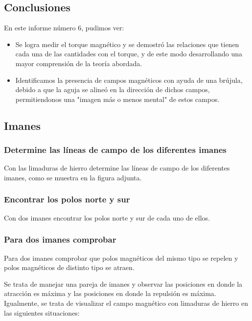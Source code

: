\subsection{Conclusiones}

En este informe número 6, pudimos ver:

\begin{itemize}
    \item Se logra medir el torque magnético y se demostró las relaciones que
          tienen cada una de las cantidades con el torque, y de este modo
          desarrollando una mayor comprensión de la teoría abordada.
    \item Identificamos la presencia de campos magnéticos con ayuda de una
          brújula, debido a que la aguja se alineó en la dirección de dichos
          campos, permitiendonos una "imagen más o menos mental" de estos campos.
\end{itemize}



\subsection{Imanes}

\subsubsection{Determine las líneas de campo de los diferentes imanes}
Con las limaduras de hierro determine las líneas de campo de los diferentes
imanes, como se muestra en la figura adjunta.


\subsubsection{Encontrar los polos norte y sur}
Con dos imanes encontrar los polos norte y sur de cada uno de ellos.


\subsubsection{Para dos imanes comprobar}
Para dos imanes comprobar que polos magnéticos del mismo tipo se repelen y polos
magnéticos de distinto tipo se atraen.

Se trata de manejar una pareja de imanes y observar las posiciones en donde la
atracción es máxima y las posiciones en donde la repulsión es máxima.
Igualmente, se trata de visualizar el campo magnético con limaduras de hierro en
las siguientes situaciones:

